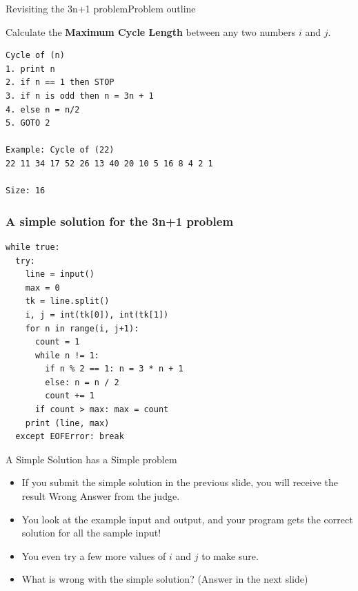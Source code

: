 \begin{frame}[fragile]{Revisiting the 3n+1 problem}{Problem outline}

  \begin{block}{}
    Calculate the {\bf Maximum Cycle Length} between any two numbers $i$ and $j$.
  \end{block}
  \bigskip

\begin{verbatim}
Cycle of (n)
1. print n
2. if n == 1 then STOP
3. if n is odd then n = 3n + 1
4. else n = n/2
5. GOTO 2

Example: Cycle of (22)
22 11 34 17 52 26 13 40 20 10 5 16 8 4 2 1

Size: 16
\end{verbatim}
\end{frame}

\begin{frame}[fragile]
  \frametitle{A simple solution for the 3n+1 problem}
\begin{verbatim}
while true:
  try:
    line = input()
    max = 0
    tk = line.split()
    i, j = int(tk[0]), int(tk[1])
    for n in range(i, j+1):
      count = 1
      while n != 1:
        if n % 2 == 1: n = 3 * n + 1
        else: n = n / 2
        count += 1
      if count > max: max = count
    print (line, max)
  except EOFError: break
\end{verbatim}
\end{frame}

\begin{frame}{A Simple Solution has a Simple problem}

  \begin{itemize}
    \item If you submit the simple solution in the previous slide, you will receive the result \alert{Wrong Answer} from the judge.
    \bigskip

    \item You look at the example input and output, and your program gets the correct solution for all the sample input!
    \item You even try a few more values of $i$ and $j$ to make sure.
    \bigskip

    \item What is wrong with the simple solution? (Answer in the next slide)
  \end{itemize}
\end{frame}

